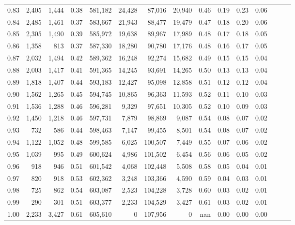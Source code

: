 \begin{tabular}{rrrrrrrrrrrrrrr}
0.83 &   2,405 &  1,444 &  0.38 &  581,182 &   24,428 &   87,016 &   20,940 &  0.46 &  0.19 &  0.23 &      0.06 \\
0.84 &   2,485 &  1,461 &  0.37 &  583,667 &   21,943 &   88,477 &   19,479 &  0.47 &  0.18 &  0.20 &      0.06 \\
0.85 &   2,305 &  1,490 &  0.39 &  585,972 &   19,638 &   89,967 &   17,989 &  0.48 &  0.17 &  0.18 &      0.05 \\
0.86 &   1,358 &    813 &  0.37 &  587,330 &   18,280 &   90,780 &   17,176 &  0.48 &  0.16 &  0.17 &      0.05 \\
0.87 &   2,032 &  1,494 &  0.42 &  589,362 &   16,248 &   92,274 &   15,682 &  0.49 &  0.15 &  0.15 &      0.04 \\
0.88 &   2,003 &  1,417 &  0.41 &  591,365 &   14,245 &   93,691 &   14,265 &  0.50 &  0.13 &  0.13 &      0.04 \\
0.89 &   1,818 &  1,407 &  0.44 &  593,183 &   12,427 &   95,098 &   12,858 &  0.51 &  0.12 &  0.12 &      0.04 \\
0.90 &   1,562 &  1,265 &  0.45 &  594,745 &   10,865 &   96,363 &   11,593 &  0.52 &  0.11 &  0.10 &      0.03 \\
0.91 &   1,536 &  1,288 &  0.46 &  596,281 &    9,329 &   97,651 &   10,305 &  0.52 &  0.10 &  0.09 &      0.03 \\
0.92 &   1,450 &  1,218 &  0.46 &  597,731 &    7,879 &   98,869 &    9,087 &  0.54 &  0.08 &  0.07 &      0.02 \\
0.93 &     732 &    586 &  0.44 &  598,463 &    7,147 &   99,455 &    8,501 &  0.54 &  0.08 &  0.07 &      0.02 \\
0.94 &   1,122 &  1,052 &  0.48 &  599,585 &    6,025 &  100,507 &    7,449 &  0.55 &  0.07 &  0.06 &      0.02 \\
0.95 &   1,039 &    995 &  0.49 &  600,624 &    4,986 &  101,502 &    6,454 &  0.56 &  0.06 &  0.05 &      0.02 \\
0.96 &     918 &    946 &  0.51 &  601,542 &    4,068 &  102,448 &    5,508 &  0.58 &  0.05 &  0.04 &      0.01 \\
0.97 &     820 &    918 &  0.53 &  602,362 &    3,248 &  103,366 &    4,590 &  0.59 &  0.04 &  0.03 &      0.01 \\
0.98 &     725 &    862 &  0.54 &  603,087 &    2,523 &  104,228 &    3,728 &  0.60 &  0.03 &  0.02 &      0.01 \\
0.99 &     290 &    301 &  0.51 &  603,377 &    2,233 &  104,529 &    3,427 &  0.61 &  0.03 &  0.02 &      0.01 \\
1.00 &   2,233 &  3,427 &  0.61 &  605,610 &        0 &  107,956 &        0 &   nan &  0.00 &  0.00 &      0.00 \\
\bottomrule
\end{tabular}
